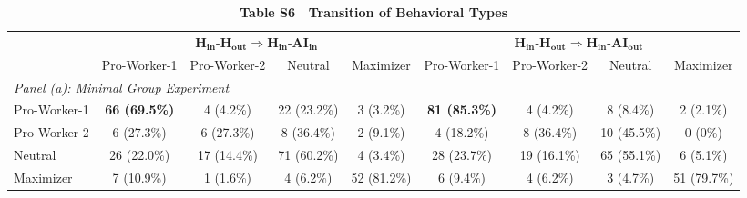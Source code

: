 \begin{table}[htbp]
\centering
\caption{\textbf{Table S6 $\vert$ Transition of Behavioral Types}}
\label{tab:transition_types}
\small
\setlength{\tabcolsep}{4pt}
\begin{tabular}{lcccccccc}
\toprule\toprule
 & \multicolumn{4}{c}{$\mathbf{H_{in}}$-$\mathbf{H_{out}} \Rightarrow \mathbf{H_{in}}$-$\mathbf{AI_{in}}$} & \multicolumn{4}{c}{$\mathbf{H_{in}}$-$\mathbf{H_{out}} \Rightarrow \mathbf{H_{in}}$-$\mathbf{AI_{out}}$} \\
\cmidrule(lr){2-5} \cmidrule(lr){6-9}
 & Pro-Worker-1 & Pro-Worker-2 & Neutral & Maximizer & Pro-Worker-1 & Pro-Worker-2 & Neutral & Maximizer \\
\midrule
\multicolumn{9}{l}{\emph{Panel (a): Minimal Group Experiment}} \\
\quad Pro-Worker-1 & \textbf{66 (69.5\%)} & 4 (4.2\%) & 22 (23.2\%) & 3 (3.2\%) & \textbf{81 (85.3\%)} & 4 (4.2\%) & 8 (8.4\%) & 2 (2.1\%) \\
\quad Pro-Worker-2 & 6 (27.3\%) & 6 (27.3\%) & 8 (36.4\%) & 2 (9.1\%) & 4 (18.2\%) & 8 (36.4\%) & 10 (45.5\%) & 0 (0\%) \\
\quad Neutral & 26 (22.0\%) & 17 (14.4\%) & 71 (60.2\%) & 4 (3.4\%) & 28 (23.7\%) & 19 (16.1\%) & 65 (55.1\%) & 6 (5.1\%) \\
\quad Maximizer & 7 (10.9\%) & 1 (1.6\%) & 4 (6.2\%) & 52 (81.2\%) & 6 (9.4\%) & 4 (6.2\%) & 3 (4.7\%) & 51 (79.7\%) \\
\bottomrule\bottomrule
\end{tabular}
\end{table}